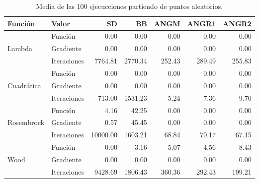 \begin{table}[H]
    \small
    \centering
    \begin{tabular}{llrrrrr}
        \hline
        \textbf{Función} & \textbf{Valor} & \textbf{SD} & \textbf{BB} & \textbf{ANGM} & \textbf{ANGR1} & \textbf{ANGR2} \\[0.1cm]\hline
                         & Función        & 0.00        & 0.00        & 0.00          & 0.00           & 0.00           \\
        Lambda           & Gradiente      & 0.00        & 0.00        & 0.00          & 0.00           & 0.00           \\
                         & Iteraciones    & 7764.81     & 2770.34     & 252.43        & 289.49         & 255.83         \\\hline
                         & Función        & 0.00        & 0.00        & 0.00          & 0.00           & 0.00           \\
        Cuadrática       & Gradiente      & 0.00        & 0.00        & 0.00          & 0.00           & 0.00           \\
                         & Iteraciones    & 713.00      & 1531.23     & 5.24          & 7.36           & 9.70           \\\hline
                         & Función        & 4.16        & 42.25       & 0.00          & 0.00           & 0.00           \\
        Rosembrock       & Gradiente      & 0.57        & 45.45       & 0.00          & 0.00           & 0.00           \\
                         & Iteraciones    & 10000.00    & 1603.21     & 68.84         & 70.17          & 67.15          \\\hline
                         & Función        & 0.00        & 3.16        & 5.07          & 4.56           & 8.43           \\
        Wood             & Gradiente      & 0.00        & 0.00        & 0.00          & 0.00           & 0.00           \\
                         & Iteraciones    & 9428.69     & 1806.43     & 360.36        & 292.43         & 199.21         \\\hline
    \end{tabular}
    \caption{Media de las 100 ejecucciones partiendo de puntos aleatorios.}
    \label{table:mean}
\end{table}